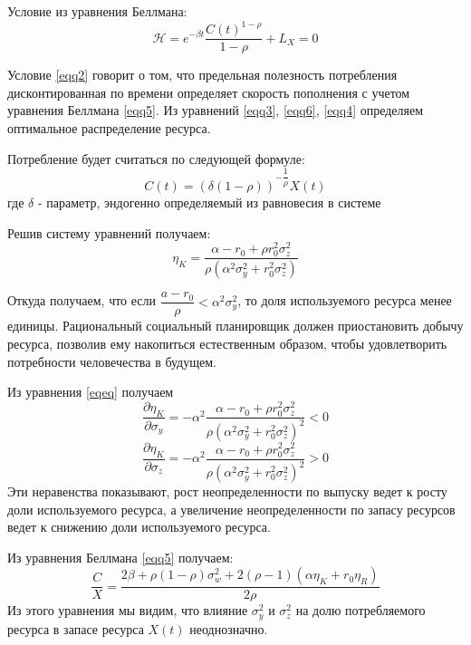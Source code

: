 \documentclass[12pt,a4paper, oneside]{extreport}
\begin{document}
Условие из уравнения  Беллмана: 
\begin{equation}\label{eqq5}
\mathcal{H} = e^{-\beta t} \dfrac{C(t)^{1-\rho}}{1-\rho}     + L_X  = 0
\end{equation}

Условие \eqref{eqq2} говорит о том, что предельная полезность потребления дисконтированная  по времени определяет скорость пополнения с учетом  уравнения  Беллмана \eqref{eqq5}. Из уравнений  \eqref{eqq3}, \eqref{eqq6}, \eqref{eqq4} определяем  оптимальное распределение ресурса.

Потребление будет считаться по следующей формуле:
\begin{equation}\label{cc}
C(t) = (\delta (1-\rho) )^{-\dfrac{1}{\rho} } X(t) 
\end{equation}
где $ \delta $ - параметр,  эндогенно  определяемый из равновесия в системе 

Решив систему уравнений получаем:
\begin{equation}\label{eqeq}
\eta_K = \dfrac{\alpha - r_0 + \rho r_0^2 \sigma_{z}^2}{\rho( \alpha^{2}  \sigma_{y}^{2} +  r_0^{2} \sigma_{z}^{2}   )}
\end{equation} 

Откуда получаем, что если $ \dfrac{a - r_0}{\rho} <  \alpha^{2}  \sigma_{y}^{2}   $,   то доля  используемого  ресурса менее единицы. Рациональный  социальный планировщик  должен приостановить добычу ресурса, позволив ему накопиться естественным образом, чтобы  удовлетворить потребности человечества в будущем.

Из уравнения \ref{eqeq} получаем
\begin{equation}\label{eqeq1}
\dfrac{\partial \eta_K}{\partial \sigma_{y} } = - \alpha^2 \dfrac{\alpha - r_0 + \rho r_0^2 \sigma_{z}^2}{\rho( \alpha^{2}  \sigma_{y}^{2} +  r_0^{2} \sigma_{z}^{2}   )^2} <0 
\end{equation}
\begin{equation}\label{eqeq2}
\dfrac{\partial \eta_K}{\partial \sigma_{z} } = - \alpha^2 \dfrac{\alpha - r_0 + \rho r_0^2 \sigma_{z}^2}{\rho( \alpha^{2}  \sigma_{y}^{2} +  r_0^{2} \sigma_{z}^{2}   )^2} > 0 
\end{equation}
Эти неравенства показывают, рост неопределенности по выпуску  ведет к росту доли  используемого ресурса, а  увеличение неопределенности по  запасу ресурсов  ведет к снижению  доли используемого   ресурса.

Из уравнения Беллмана \eqref{eqq5} получаем: 
\begin{equation}\label{cc1}
\dfrac{C}{X} = \dfrac{2\beta + \rho(1-\rho)\sigma_{w}^2 + 2 (\rho - 1 ) (\alpha \eta_K + r_0 \eta_R)}{2\rho} 
\end{equation}
Из этого уравнения мы видим, что влияние  $ \sigma_{y}^2 $ и $  \sigma_{z}^2 $ на  долю потребляемого ресурса в запасе  ресурса $ X(t) $ неоднозначно. 
\end{document}
